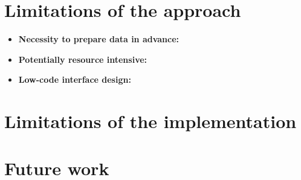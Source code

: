 \section{Limitations of the approach}

\begin{itemize}
	\item \textbf{Necessity to prepare data in advance:}
	\item \textbf{Potentially resource intensive:}
	\item \textbf{Low-code interface design:}
\end{itemize}

\section{Limitations of the implementation}

\section{Future work}

